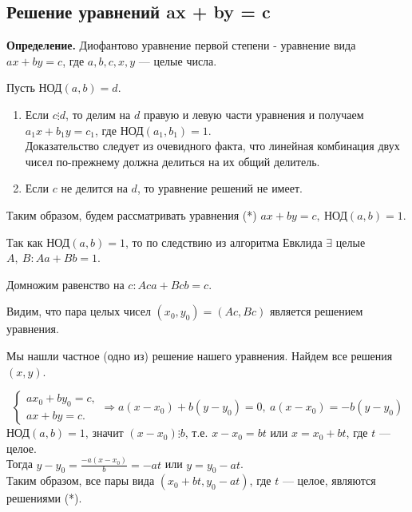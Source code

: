 \documentclass{article}
\begin{document}
        \subsection{Решение уравнений ax + by = c}
        	\textbf{Определение.} Диофантово уравнение первой степени - уравнение вида \( ax + by = c \), где \( a,b,c,x,y \) --- целые числа.

            Пусть \( \textrm{НОД}(a,b) = d \).
            
            \begin{enumerate}
                \item Если \( c \vdots d \), то делим на \( d \) правую и левую части уравнения и получаем \( a_1x + b_1y = c_1 \), где \( \textrm{НОД}(a_1, b_1) = 1 \).\\
                Доказательство следует из очевидного факта, что линейная комбинация двух чисел по-прежнему должна делиться на их общий делитель.
                \item Если \( c \) не делится на \( d \), то уравнение решений не имеет.
            \end{enumerate}

            Таким образом, будем рассматривать уравнения (*) \( ax + by = c,\ \textrm{НОД}(a,b) = 1 \).

            Так как \( \textrm{НОД}(a, b) = 1 \), то по следствию из алгоритма Евклида \( \exists \) целые \( A,\ B: Aa + Bb = 1 \).

            Домножим равенство на \( c: Aca + Bcb = c \).
            
            Видим, что пара целых чисел \( (x_0,y_0) = (Ac, Bc) \) является решением уравнения.

            Мы нашли частное (одно из) решение нашего уравнения. Найдем все решения \( (x,y) \).

            \[ \begin{cases}
                ax_0 + by_0 = c,\\
                ax + by = c.
            \end{cases} \Rightarrow a(x - x_0) + b(y - y_0) = 0,\ a(x - x_0) = -b(y - y_0) \]
            \( \textrm{НОД}(a,b) = 1 \), значит \( (x - x_0) \vdots b \), т.е. \( x - x_0 = bt \) или \( x = x_0 + bt \), где \( t \) --- целое.\\
            Тогда \( y - y_0 = \frac{-a(x - x_0)}{b} = -at \) или \( y = y_0 - at \).\\
            Таким образом, все пары вида \( (x_0 + bt, y_0 - at) \), где \( t \) --- целое, являются решениями (*).
\end{document}
